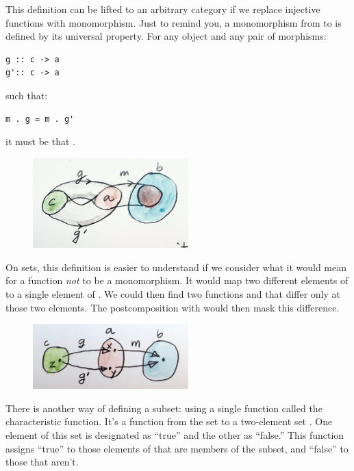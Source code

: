 \noindent
This definition can be lifted to an arbitrary category if we replace
injective functions with monomorphism. Just to remind you, a
monomorphism  from  to  is defined by its
universal property. For any object  and any pair of morphisms:

\begin{Verbatim}[commandchars=\\\{\}]
g :: c -> a
g':: c -> a
\end{Verbatim}
such that:

\begin{Verbatim}[commandchars=\\\{\}]
m . g = m . g'
\end{Verbatim}
it must be that .

\begin{figure}[H]
\centering
\includegraphics[width=60mm]{images/monomorphism.jpg}
\end{figure}

\noindent
On sets, this definition is easier to understand if we consider what it
would mean for a function  \emph{not} to be a monomorphism. It
would map two different elements of  to a single element of
. We could then find two functions  and
 that differ only at those two elements. The
postcomposition with  would then mask this difference.

\begin{figure}[H]
\centering
\includegraphics[width=60mm]{images/notmono.jpg}
\end{figure}

\noindent
There is another way of defining a subset: using a single function
called the characteristic function. It's a function  from the
set  to a two-element set . One element of this set
is designated as ``true'' and the other as ``false.'' This function
assigns ``true'' to those elements of  that are members of the
subset, and ``false'' to those that aren't.

